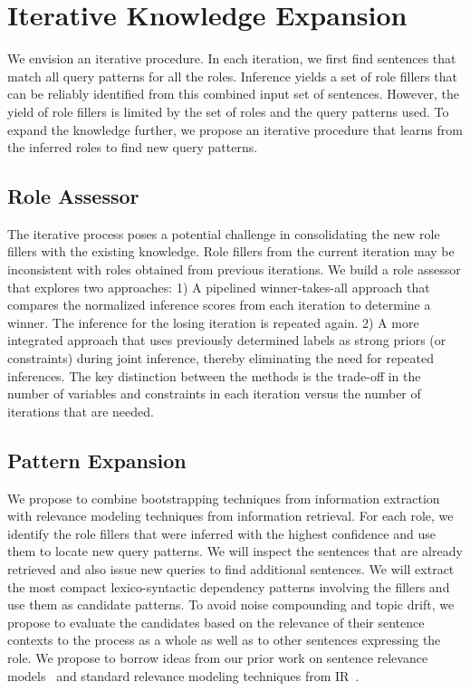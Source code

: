 \section{Iterative Knowledge Expansion}

We envision an iterative procedure. In each iteration, we first find sentences that match all query patterns for all the roles. 
Inference yields a set of role fillers that can be reliably identified from this combined input set of sentences. 
However, the yield of role fillers is limited by the set of roles and the query patterns used.
To expand the knowledge further, we propose an iterative procedure that learns from the inferred roles to find new query patterns. 

\subsection{Role Assessor}

The iterative process poses a potential challenge in consolidating the new role fillers with the existing knowledge.
Role fillers from the current iteration may be inconsistent with roles obtained from previous iterations. 
We build a role assessor that explores two approaches: 1) A pipelined winner-takes-all approach that compares the normalized inference scores from each iteration to determine a winner. The inference for the losing iteration is repeated again.  2) A more integrated approach that uses previously determined labels as strong priors (or constraints) during joint inference, thereby eliminating the need for repeated inferences. The key distinction between the methods is the trade-off in the number of variables and constraints in each iteration versus the number of iterations that are needed. 

\subsection{Pattern Expansion}

We propose to combine bootstrapping techniques from information extraction with relevance modeling techniques from information retrieval. For each role, we identify the role fillers that were inferred with the highest confidence and use them to locate new query patterns. We will inspect the sentences that are already retrieved and also issue new queries to find additional sentences. 
We will extract the most compact lexico-syntactic dependency patterns involving the fillers and use them as candidate patterns.
To avoid noise compounding and topic drift, we propose to evaluate the candidates based on the relevance of their sentence contexts to the process as a whole as well as to other sentences expressing the role. We propose to borrow ideas from our prior work on sentence relevance models~\cite{balasubramanian2009automatic} and standard relevance modeling techniques from IR~\cite{lavrenko2001relevance}.

